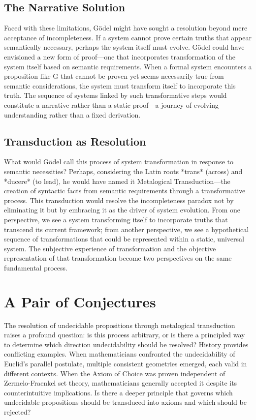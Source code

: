 \documentclass[runningheads]{llncs}
\begin{document}
\subsection{The Narrative Solution}

Faced with these limitations, Gödel might have sought a resolution beyond mere acceptance of incompleteness. If a system cannot prove certain truths that appear semantically necessary, perhaps the system itself must evolve. Gödel could have envisioned a new form of proof—one that incorporates transformation of the system itself based on semantic requirements. When a formal system encounters a proposition like G that cannot be proven yet seems necessarily true from semantic considerations, the system must transform itself to incorporate this truth. The sequence of systems linked by such transformative steps would constitute a narrative rather than a static proof—a journey of evolving understanding rather than a fixed derivation.

\subsection{Transduction as Resolution}

What would Gödel call this process of system transformation in response to semantic necessities? Perhaps, considering the Latin roots *trans* (across) and *ducere* (to lead), he would have named it Metalogical Transduction—the creation of syntactic facts from semantic requirements through a transformative process. This transduction would resolve the incompleteness paradox not by eliminating it but by embracing it as the driver of system evolution. From one perspective, we see a system transforming itself to incorporate truths that transcend its current framework; from another perspective, we see a hypothetical sequence of transformations that could be represented within a static, universal system. The subjective experience of transformation and the objective representation of that transformation become two perspectives on the same fundamental process.

\section{A Pair of Conjectures}

The resolution of undecidable propositions through metalogical transduction raises a profound question: is this process arbitrary, or is there a principled way to determine which direction undecidability should be resolved? History provides conflicting examples. When mathematicians confronted the undecidability of Euclid's parallel postulate, multiple consistent geometries emerged, each valid in different contexts. When the Axiom of Choice was proven independent of Zermelo-Fraenkel set theory, mathematicians generally accepted it despite its counterintuitive implications. Is there a deeper principle that governs which undecidable propositions should be transduced into axioms and which should be rejected?
\end{document}
